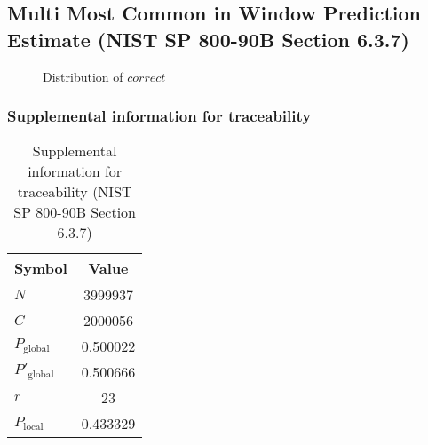 \documentclass[a3paper,xelatex,english]{bxjsarticle}
\begin{document}
\subsection{Multi Most Common in Window Prediction Estimate (NIST SP 800-90B Section 6.3.7)}\label{sec:Binary637}

\begin{figure}[htbp]
\centering

\caption{Distribution of $correct$}
\end{figure}
\subsubsection{Supplemental information for traceability}
\renewcommand{\arraystretch}{1.8}
\begin{table}[h]
\caption{Supplemental information for traceability (NIST SP 800-90B Section 6.3.7)}
\begin{center}
\begin{tabular}{|l|c|}
\hline 
\rowcolor{anotherlightblue} %
Symbol				& Value \\ \hline 
$N$				& 3999937\\ \hline 
$C$				& 2000056\\ \hline 
$P_{\textrm{global}}$				& 0.500022\\ \hline 
$P'_{\textrm{global}}$			& 0.500666\\ \hline 
$r$				& 23\\ \hline 
$P_{\textrm{local}}$ 			& 0.433329\\ \hline
\end{tabular}
\end{center}
\end{table}
\renewcommand{\arraystretch}{1.4}
\clearpage
\end{document}
